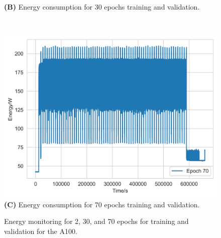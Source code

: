 \documentclass[utf8]{FrontiersinVancouver} %
\begin{document}
\begin{figure}[p]
\begin{center}
\begin{minipage}[t]{0.30\textwidth}
        {\bf (B)} Energy consumption for 30 epochs training and validation.
     \end{minipage}
     \ \
     \begin{minipage}[t]{0.30\textwidth}
        \includegraphics[width=1.0\linewidth]{images/card-name-v100-gpu-count-1-cpu-num-6-mem-32gb-repeat-1-tfttransformerepochs-70.png}
        {\bf (C)} Energy consumption for 70 epochs training and validation.
     \end{minipage}
  \end{center}

  \caption {Energy monitoring for 2, 30, and 70 epochs for training and validation for the A100.}
  \label{fig:energy}

\end{figure}

\end{document}

